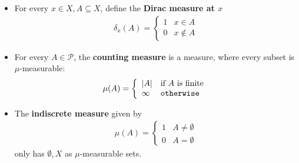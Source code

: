 \begin{ex}[]
  \begin{itemize}
    \item For every $x \in X, A \subseteq X$, define the \textbf{Dirac measure at $x$}
      \begin{align*}
        \delta_x(A) =\left\{\begin{array}{ll}
            1 & x \in A \\
            0 & x \notin A
        \end{array} \right.
      \end{align*}
    \item For every $A \in \mathcal{P}$, the \textbf{counting measure} is a measure, where every subset is $\mu$-measurable:
      \begin{align*}
        \mu(A) = \left\{\begin{array}{ll}
            \vert A\vert & \text{if $A$ is finite} \\
           \infty & \texttt{otherwise}
        \end{array} \right.
      \end{align*}
    \item The \textbf{indiscrete measure} given by
      \begin{align*}
        \mu(A) = \left\{\begin{array}{ll}
          1 & A \neq \emptyset \\
          0 & A = \emptyset
        \end{array} \right.
      \end{align*}
      only has $\emptyset,X$ as $\mu$-measurable sets.
  \end{itemize}
\end{ex}
